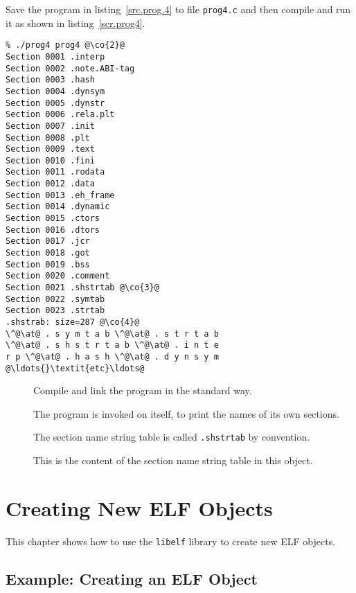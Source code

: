 \documentclass[a4paper,pdftex]{book}
\makeatletter
\newcommand{\code}[1]{\texttt{#1}}
\newcommand{\filename}[1]{\texttt{#1}}
\newcommand{\library}[1]{\texttt{#1}}
\newenvironment{callout}[2][black]{%
  \begingroup\newcommand{\@cocolor}{#1}%
  \setlength{\shadowsize}{1.2pt}%
  \newcommand{\@cogroup}[1]{#2}}{\endgroup}
\newcommand{\@co}[1]{\shadowbox{\color{\@cocolor}#1}}
\newcommand{\co}[1]{%
  \hypertarget{\@cogroup.#1.co}{%
    \hyperlink{\@cogroup.#1.cr}{\@co{#1}}}}
\newcommand{\coref}[1]{%
  \hypertarget{\@cogroup.#1.cr}{%
    \hyperlink{\@cogroup.#1.co}{\@co{#1}}}}
\makeatother
\begin{document}
Save the program in listing~\vref{src.prog.4} to file
\filename{prog4.c} and then compile and run it as shown in
listing~\vref{scr.prog4}.%

\begin{callout}{scr4}
  \newcommand{\at}{@}
  \begin{lstlisting}[language={}, basicstyle=\small\ttfamily,
      label=scr.prog4, caption=Compiling and Running prog4]
% cc -o prog4 prog4.c -lelf @\co{1}@
% ./prog4 prog4 @\co{2}@
Section 0001 .interp
Section 0002 .note.ABI-tag
Section 0003 .hash
Section 0004 .dynsym
Section 0005 .dynstr
Section 0006 .rela.plt
Section 0007 .init
Section 0008 .plt
Section 0009 .text
Section 0010 .fini
Section 0011 .rodata
Section 0012 .data
Section 0013 .eh_frame
Section 0014 .dynamic
Section 0015 .ctors
Section 0016 .dtors
Section 0017 .jcr
Section 0018 .got
Section 0019 .bss
Section 0020 .comment
Section 0021 .shstrtab @\co{3}@
Section 0022 .symtab
Section 0023 .strtab
.shstrab: size=287 @\co{4}@
\^@\at@ . s y m t a b \^@\at@ . s t r t a b
\^@\at@ . s h s t r t a b \^@\at@ . i n t e
r p \^@\at@ . h a s h \^@\at@ . d y n s y m
@\ldots{}\textit{etc}\ldots@
  \end{lstlisting}

  \begin{description}
  \item[\coref{1}] Compile and link the program in the standard way.
  \item[\coref{2}] The program is invoked on itself, to print the
    names of its own sections.
  \item[\coref{3}] The section name string table is called
    \code{.shstrtab} by convention.
  \item[\coref{4}] This is the content of the section name string
    table in this object.
  \end{description}
\end{callout}

\chapter{Creating New ELF Objects}\label{chap.creating-elf}

This chapter shows how to use the \library{libelf} library to create
new ELF objects.

\section{Example: Creating an ELF Object}
\end{document}
